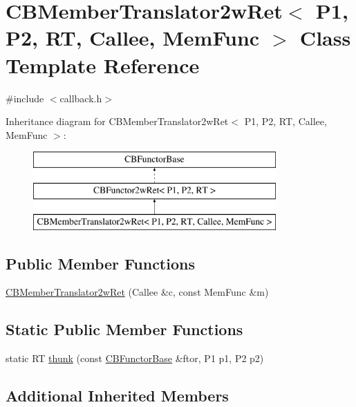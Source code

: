 \hypertarget{class_c_b_member_translator2w_ret}{\section{C\+B\+Member\+Translator2w\+Ret$<$ P1, P2, R\+T, Callee, Mem\+Func $>$ Class Template Reference}
\label{class_c_b_member_translator2w_ret}
}


{\ttfamily \#include $<$callback.\+h$>$}

Inheritance diagram for C\+B\+Member\+Translator2w\+Ret$<$ P1, P2, R\+T, Callee, Mem\+Func $>$\+:\begin{figure}[H]
\begin{center}
\leavevmode
\includegraphics[height=3.000000cm]{class_c_b_member_translator2w_ret}
\end{center}
\end{figure}
\subsection*{Public Member Functions}
\begin{DoxyCompactItemize}
\item 
\hyperlink{class_c_b_member_translator2w_ret_af4e5eb13ea4b7e03e101f26e5292ae6f}{C\+B\+Member\+Translator2w\+Ret} (Callee \&c, const Mem\+Func \&m)
\end{DoxyCompactItemize}
\subsection*{Static Public Member Functions}
\begin{DoxyCompactItemize}
\item 
static R\+T \hyperlink{class_c_b_member_translator2w_ret_a0360f997fe211b042449357b0661aa2c}{thunk} (const \hyperlink{class_c_b_functor_base}{C\+B\+Functor\+Base} \&ftor, P1 p1, P2 p2)
\end{DoxyCompactItemize}
\subsection*{Additional Inherited Members}


